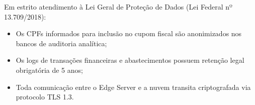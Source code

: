 Em estrito atendimento à Lei Geral de Proteção de Dados (Lei Federal nº 13.709/2018):
\begin{itemize}
    \item Os CPFs informados para inclusão no cupom fiscal são anonimizados nos bancos de auditoria analítica;
    \item Os logs de transações financeiras e abastecimentos possuem retenção legal obrigatória de 5 anos;
    \item Toda comunicação entre o Edge Server e a nuvem transita criptografada via protocolo TLS 1.3.
\end{itemize}

